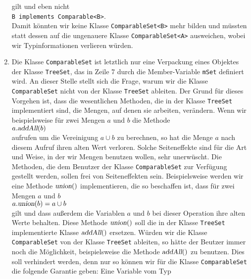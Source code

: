 \begin{enumerate}
      gilt und eben nicht
      \\[0.2cm]
      \hspace*{1.3cm}
      \texttt{B implements Comparable<B>}.
      \\[0.2cm]
      Damit k\"onnten wir keine Klasse \texttt{ComparableSet<B>} mehr bilden und
      m\"ussten statt dessen auf die ungenauere Klasse \texttt{ComparableSet<A>} ausweichen,
      wobei  wir Typinformationen verlieren w\"urden.
\item Die Klasse \texttt{ComparableSet} ist letztlich nur eine Verpackung eines 
      Objektes der Klasse \texttt{TreeSet}, das in Zeile 7 durch die Member-Variable
      \texttt{mSet}  definiert wird.  An dieser Stelle stellt sich die Frage,
      warum wir die Klasse \texttt{ComparableSet} nicht von der Klasse \texttt{TreeSet}
      ableiten.  Der Grund f\"ur dieses Vorgehen ist, dass die wesentlichen Methoden, die in der
      Klasse \texttt{TreeSet} implementiert sind, die Mengen, auf denen sie arbeiten,
      ver\"andern.  Wenn wir beispielsweise f\"ur zwei Mengen $a$ und $b$ die Methode
      \\[0.2cm]
      \hspace*{1.3cm}
      $a.\textsl{addAll}(b)$
      \\[0.2cm]
      aufrufen um die Vereinigung $a \cup b$ zu berechnen, so hat die Menge $a$ nach
      diesem Aufruf ihren alten Wert verloren.  Solche Seiteneffekte sind f\"ur die Art und
      Weise, in der wir Mengen benutzen wollen, sehr unerw\"uscht.  Die Methoden, die dem
      Benutzer der Klasse \texttt{ComparableSet} zur Verf\"ugung gestellt werden, sollen
      frei von Seiteneffekten sein.  Beispielsweise werden wir eine Methode $\textsl{union}()$
      implementieren, die so beschaffen ist, dass f\"ur zwei Mengen $a$ und $b$
      \\[0.2cm]
      \hspace*{1.3cm}
      $a.\textsl{union}(b) = a \cup b$
      \\[0.2cm]
      gilt und dass au\ss{}erdem die Variablen $a$ und $b$ bei dieser Operation ihre alten Werte behalten.
      Diese Methode $\textsl{union}()$ soll die in der Klasse \texttt{TreeSet} implementierte Klasse
      $\textsl{addAll}()$ ersetzen.  W\"urden wir die Klasse \texttt{ComparableSet} von der Klasse
      \texttt{TreeSet} ableiten, so h\"atte der Beutzer immer noch die M\"oglichkeit, beispielsweise die
      Methode $\textsl{addAll}()$ zu benutzen.  Dies soll verhindert werden, denn nur so k\"onnen wir f\"ur
      die Klasse \texttt{ComparableSet} die folgende Garantie geben: Eine Variable vom Typ

\end{enumerate}
